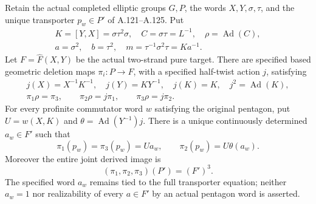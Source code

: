 Retain the actual completed elliptic groups \(G,P\), the words
\(X,Y,\sigma,\tau\), and the unique transporter \(p_w\in P'\) of
A.121--A.125. Put
\[
 \begin{gathered}
 K=[Y,X]=\sigma\tau^2\sigma,\quad
 C=\sigma\tau=L^{-1},\quad \rho=\operatorname{Ad}(C),\\
 a=\sigma^2,\quad b=\tau^2,\quad
 m=\tau^{-1}\sigma^2\tau=K a^{-1}.
 \end{gathered}                                               \tag{A.126.1}
\]
Let \(F=\widehat F(X,Y)\) be the actual two-strand pure target.
There are specified based geometric deletion maps
\(\pi_i:P\to F\), with a specified half-twist action \(j\), satisfying
\[
 \begin{gathered}
 j(X)=X^{-1}K^{-1},\quad j(Y)=KY^{-1},\quad
 j(K)=K,\quad j^2=\operatorname{Ad}(K),\\
 \pi_1\rho=\pi_3,\qquad
 \pi_2\rho=j\pi_1,\qquad \pi_3\rho=j\pi_2.
 \end{gathered}                                               \tag{A.126.2}
\]
For every profinite commutator word \(w\) satisfying the original
pentagon, put \(U=w(X,K)\) and
\(\theta=\operatorname{Ad}(Y^{-1})j\). There is a unique
continuously determined \(a_w\in F'\) such that
\[
 \pi_1(p_w)=\pi_3(p_w)=Ua_w,\qquad
 \pi_2(p_w)=U\theta(a_w).                                    \tag{A.126.3}
\]
Moreover the entire joint derived image is
\[
             (\pi_1,\pi_2,\pi_3)(P')=(F')^3.                 \tag{A.126.4}
\]
The specified word \(a_w\) remains tied to the full transporter
equation; neither \(a_w=1\) nor realizability of every \(a\in F'\)
by an actual pentagon word is asserted.

